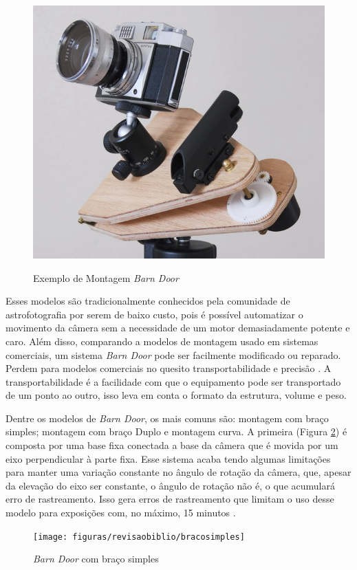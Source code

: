 \begin{figure}[!htb]
	\centering
	\caption{Exemplo de Montagem \textit{Barn Door}}
	\includegraphics[width=0.5\linewidth]{figuras/revisaobiblio/barndoorexample}
	\label{fig:barndoorexample}
\end{figure}


Esses modelos são tradicionalmente conhecidos pela comunidade de astrofotografia por serem de baixo custo, pois é possível automatizar o movimento da câmera sem a necessidade de um motor demasiadamente potente e caro. Além disso, comparando a modelos de montagem usado em sistemas comerciais, um sistema \textit{Barn Door} pode ser facilmente modificado ou reparado. Perdem para modelos comerciais no quesito transportabilidade e precisão \cite{site:pentaxBarnDoor}. A transportabilidade é a facilidade com que o equipamento pode ser transportado de um ponto ao outro, isso leva em conta o formato da estrutura, volume e peso.
 
Dentre os modelos de \textit{Barn Door}, os mais comuns são: montagem com braço simples; montagem com braço Duplo e montagem curva. A primeira (Figura \ref{fig:singleArm}) é composta por uma base fixa conectada a base da câmera que é movida por um eixo perpendicular à parte fixa. Esse sistema acaba tendo algumas limitações para manter uma variação constante no ângulo de rotação da câmera, que, apesar da elevação do eixo ser constante, o ângulo de rotação não é, o que acumulará erro de rastreamento. Isso gera erros de rastreamento que limitam o uso desse modelo para exposições com, no máximo, 15 minutos \cite{artigo:davidtrottinventions}. 

\begin{figure}[!htb]
	\centering
	\caption{\textit{Barn Door} com braço simples}
	\texttt{[image: figuras/revisaobiblio/bracosimples]}
	\label{fig:singleArm}
\end{figure}

